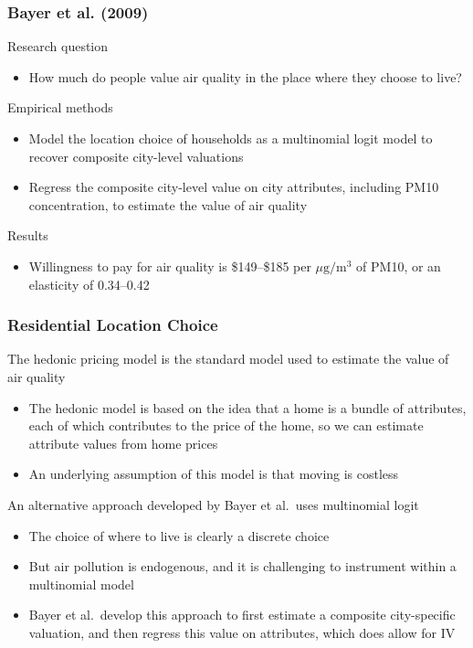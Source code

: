 \documentclass{beamer}\usepackage[]{graphicx}\usepackage[]{color}
\begin{document}
\begin{frame}\frametitle{Bayer et al. (2009)}
    Research question
    \begin{itemize}
        \item How much do people value air quality in the place where they choose to live?
    \end{itemize}
    \vspace{2ex}
    Empirical methods
    \begin{itemize}
      \item Model the location choice of households as a multinomial logit model to recover composite city-level valuations
      \item Regress the composite city-level value on city attributes, including PM10 concentration, to estimate the value of air quality
    \end{itemize}
    \vspace{2ex}
    Results
    \begin{itemize}
      \item Willingness to pay for air quality is \$149--\$185 per $\mu \text{g} / \text{m}^3$ of PM10, or an elasticity of 0.34--0.42
    \end{itemize}
\end{frame}

\begin{frame}\frametitle{Residential Location Choice}
    The hedonic pricing model is the standard model used to estimate the value of air quality
    \begin{itemize}
      \item The hedonic model is based on the idea that a home is a bundle of attributes, each of which contributes to the price of the home, so we can estimate attribute values from home prices
      \item An underlying assumption of this model is that moving is costless
    \end{itemize}
    \vspace{2ex}
    An alternative approach developed by Bayer et al.\ uses multinomial logit
    \begin{itemize}
      \item The choice of where to live is clearly a discrete choice
      \item But air pollution is endogenous, and it is challenging to instrument within a multinomial model
      \item Bayer et al.\ develop this approach to first estimate a composite city-specific valuation, and then regress this value on attributes, which does allow for IV
    \end{itemize}
\end{frame}
\end{document}
